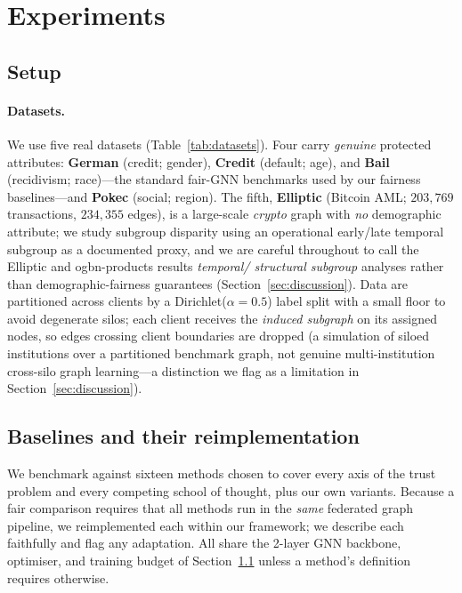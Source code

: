 \documentclass[pdflatex,sn-mathphys-num]{sn-jnl}
\theoremstyle{thmstyleone}%
\theoremstyle{thmstyletwo}%
\theoremstyle{thmstylethree}%
\begin{document}
\section{Experiments}
\label{sec:experiments}

\subsection{Setup}
\label{sec:setup}
\paragraph{Datasets.}
We use five real datasets (Table~\ref{tab:datasets}). Four carry \emph{genuine}
protected attributes: \textbf{German} (credit; gender), \textbf{Credit}
(default; age), and \textbf{Bail} (recidivism; race)---the standard fair-GNN
benchmarks used by our fairness baselines---and \textbf{Pokec} (social; region).
The fifth, \textbf{Elliptic} (Bitcoin AML; $203{,}769$ transactions,
$234{,}355$ edges), is a large-scale \emph{crypto} graph with \emph{no}
demographic attribute; we study subgroup disparity using an operational
early/late temporal subgroup as a documented proxy, and we are careful
throughout to call the Elliptic and ogbn-products results \emph{temporal/
structural subgroup} analyses rather than demographic-fairness guarantees
(Section~\ref{sec:discussion}). Data are partitioned across clients by a
Dirichlet($\alpha{=}0.5$) label split with a small floor to avoid degenerate
silos; each client receives the \emph{induced subgraph} on its assigned nodes,
so edges crossing client boundaries are dropped (a simulation of siloed
institutions over a partitioned benchmark graph, not genuine multi-institution
cross-silo graph learning---a distinction we flag as a limitation in
Section~\ref{sec:discussion}).



\subsection{Baselines and their reimplementation}
\label{sec:baselines}
We benchmark against sixteen methods chosen to cover every axis of the trust
problem and every competing school of thought, plus our own variants. Because a
fair comparison requires that all methods run in the \emph{same} federated
graph pipeline, we reimplemented each within our framework; we describe each
faithfully and flag any adaptation. All share the 2-layer GNN backbone,
optimiser, and training budget of Section~\ref{sec:setup} unless a method's
definition requires otherwise.
\end{document}
